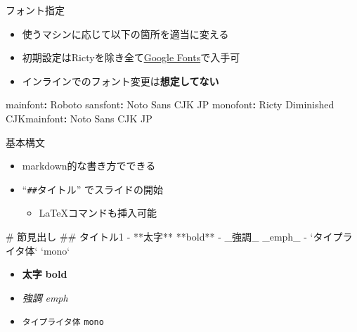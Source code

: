 \documentclass[
  12pt,
  ignorenonframetext,
]{beamer}
\newenvironment{Shaded}{\begin{snugshade}}{\end{snugshade}}
\newcommand{\AttributeTok}[1]{\textcolor[rgb]{0.77,0.63,0.00}{#1}}
\newcommand{\BaseNTok}[1]{\textcolor[rgb]{0.00,0.00,0.81}{#1}}
\newcommand{\FunctionTok}[1]{\textcolor[rgb]{0.00,0.00,0.00}{#1}}
\newcommand{\KeywordTok}[1]{\textcolor[rgb]{0.13,0.29,0.53}{\textbf{#1}}}
\newcommand{\NormalTok}[1]{#1}
\newcommand{\StringTok}[1]{\textcolor[rgb]{0.31,0.60,0.02}{#1}}
\providecommand{\tightlist}{%
  \setlength{\itemsep}{0pt}\setlength{\parskip}{0pt}}
\begin{document}
\begin{frame}[fragile]{フォント指定}
\protect\hypertarget{ux30d5ux30a9ux30f3ux30c8ux6307ux5b9a}{}

\begin{itemize}
\tightlist
\item
  使うマシンに応じて以下の箇所を適当に変える
\item
  初期設定はRictyを除き全て\href{https://fonts.google.com/?category=Sans+Serif\#standard-styles}{Google
  Fonts}で入手可
\item
  インラインでのフォント変更は\textbf{想定してない}
\end{itemize}

\begin{Shaded}
\begin{Highlighting}[]
\FunctionTok{mainfont}\KeywordTok{:}\AttributeTok{ Roboto}
\FunctionTok{sansfont}\KeywordTok{:}\AttributeTok{ Noto Sans CJK JP}
\FunctionTok{monofont}\KeywordTok{:}\AttributeTok{ Ricty Diminished}
\FunctionTok{CJKmainfont}\KeywordTok{:}\AttributeTok{ Noto Sans CJK JP}
\end{Highlighting}
\end{Shaded}

\end{frame}

\begin{frame}[fragile]{基本構文}
\protect\hypertarget{ux57faux672cux69cbux6587}{}

\begin{itemize}
\tightlist
\item
  markdown的な書き方でできる
\item
  ``\texttt{\#\#}タイトル'' でスライドの開始

  \begin{itemize}
  \tightlist
  \item
    \LaTeX コマンドも挿入可能
  \end{itemize}
\end{itemize}

\begin{Shaded}
\begin{Highlighting}[]
\FunctionTok{# 節見出し}
\FunctionTok{## タイトル1}
\NormalTok{- **太字** **bold**}
\NormalTok{- }\StringTok{_強調_ _emph_}
\StringTok{- }\BaseNTok{`タイプライタ体`}\StringTok{ }\BaseNTok{`mono`}
\end{Highlighting}
\end{Shaded}

\begin{itemize}
\tightlist
\item
  \textbf{太字} \textbf{bold}
\item
  \emph{強調} \emph{emph}
\item
  \texttt{タイプライタ体} \texttt{mono}
\end{itemize}

\end{frame}
\end{document}
